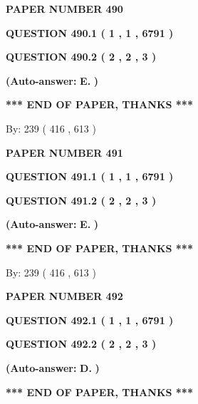 \documentclass[12pt]{article}
\begin{document}
   
 {\textbf{ \Large{ PAPER NUMBER  490  }}}
   
   
   
   
  
  
{\textbf{\large{QUESTION
490.1 
 ( 1 , 1 , 6791 )
}}}
  
  
{\textbf{\large{QUESTION
490.2 
 ( 2 , 2 , 3 )
}}}
 
 
{\textbf{(Auto-answer:}}
{\textbf{\large{
E.}}}
{\textbf{)}}
 
 
   
   
   
   
\vspace{1.0in} 
{\textbf{\large{ *** END OF PAPER, THANKS *** }}} 
   
   
\hspace{1.0in} By: 
 239 ( 416 ,  613 )
   
   
   
   
\newpage 
\setcounter{page}{ 
   491001 } 
   
   
 {\textbf{ \Large{ PAPER NUMBER  491  }}}
   
   
   
   
  
  
{\textbf{\large{QUESTION
491.1 
 ( 1 , 1 , 6791 )
}}}
  
  
{\textbf{\large{QUESTION
491.2 
 ( 2 , 2 , 3 )
}}}
 
 
{\textbf{(Auto-answer:}}
{\textbf{\large{
E.}}}
{\textbf{)}}
 
 
   
   
   
   
\vspace{1.0in} 
{\textbf{\large{ *** END OF PAPER, THANKS *** }}} 
   
   
\hspace{1.0in} By: 
 239 ( 416 ,  613 )
   
   
   
   
\newpage 
\setcounter{page}{ 
   492001 } 
   
   
 {\textbf{ \Large{ PAPER NUMBER  492  }}}
   
   
   
   
  
  
{\textbf{\large{QUESTION
492.1 
 ( 1 , 1 , 6791 )
}}}
  
  
{\textbf{\large{QUESTION
492.2 
 ( 2 , 2 , 3 )
}}}
 
 
{\textbf{(Auto-answer:}}
{\textbf{\large{
D.}}}
{\textbf{)}}
 
 
   
   
   
   
\vspace{1.0in} 
{\textbf{\large{ *** END OF PAPER, THANKS *** }}} 
   
\end{document}
